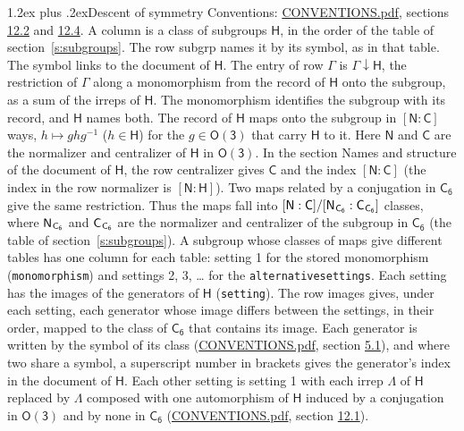 \documentclass[10pt,a4paper]{article}
\makeatletter
\renewcommand\section{\@startsection{section}{1}{\z@}{-3ex plus -1ex minus -.2ex}%
  {1.2ex plus .2ex}{\normalfont\large\sffamily\bfseries\color{parttitle}}}
\numberwithin{equation}{section}
\newcommand{\grp}[1]{\mathsf{#1}}
\newcommand{\grpindex}[2]{[#1 : #2]}
\newcommand{\restr}[2]{#1\!\downarrow#2}
\newcommand{\hairsp}{\mkern1mu}
\makeatother
\begin{document}
\section{Descent of symmetry}\label{s:subduction}
Conventions: \href{../../CONVENTIONS.pdf}{CONVENTIONS.pdf}, sections \href{../../CONVENTIONS.pdf\#conv.12.2}{12.2} and \href{../../CONVENTIONS.pdf\#conv.12.4}{12.4}.
A column is a class of subgroups $\grp{H}$, in the order of the table of section~\ref{s:subgroups}. The row subgrp names it by its symbol, as in that table. The symbol links to the document of $\grp{H}$. The entry of row $\Gamma$ is $\restr{\Gamma}{\grp{H}}$, the restriction of $\Gamma$ along a monomorphism from the record of $\grp{H}$ onto the subgroup, as a sum of the irreps of $\grp{H}$. The monomorphism identifies the subgroup with its record, and $\grp{H}$ names both. \label{n:group.normalizer.o3}\label{n:group.centralizer.o3}The record of $\grp{H}$ maps onto the subgroup in $\grpindex{\grp{N}}{\grp{C}}$ ways, $h \mapsto g h g^{-1}$ ($h \in \grp{H}$) for the $g \in \grp{O(3)}$ that carry $\grp{H}$ to it. Here $\grp{N}$ and $\grp{C}$ are the normalizer and centralizer of $\grp{H}$ in \href{O3.pdf}{$\grp{O(3)}$}. In the section Names and structure of the document of $\grp{H}$, the row centralizer gives $\grp{C}$ and the index $\grpindex{\grp{N}}{\grp{C}}$ (the index in the row normalizer is $\grpindex{\grp{N}}{\grp{H}}$). Two maps related by a conjugation in $\grp{C_{6}}$ give the same restriction. Thus the maps fall into $\grpindex{\grp{N}}{\grp{C}}/\grpindex{\grp{N}_{\hairsp \grp{C_{6}}}}{\grp{C}_{\hairsp \grp{C_{6}}}}$ classes, where $\grp{N}_{\hairsp \grp{C_{6}}}$ and $\grp{C}_{\hairsp \grp{C_{6}}}$ are the normalizer and centralizer of the subgroup in $\grp{C_{6}}$ (the table of section~\ref{s:subgroups}). \label{n:head.setting}A subgroup whose classes of maps give different tables has one column for each table: setting 1 for the stored monomorphism (\texttt{monomorphism}) and settings 2, 3, \dots{} for the \texttt{alternativesettings}. Each setting has the images of the generators of $\grp{H}$ (\texttt{setting}). \label{n:head.images}The row images gives, under each setting, each generator whose image differs between the settings, in their order, mapped to the class of $\grp{C_{6}}$ that contains its image. Each generator is written by the symbol of its class (\href{../../CONVENTIONS.pdf}{CONVENTIONS.pdf}, section \href{../../CONVENTIONS.pdf\#conv.5.1}{5.1}), and where two share a symbol, a superscript number in brackets gives the generator's index in the document of $\grp{H}$. \label{n:irrep.Delta}Each other setting is setting 1 with each irrep $\Lambda$ of $\grp{H}$ replaced by $\Lambda$ composed with one automorphism of $\grp{H}$ induced by a conjugation in \href{O3.pdf}{$\grp{O(3)}$} and by none in $\grp{C_{6}}$ (\href{../../CONVENTIONS.pdf}{CONVENTIONS.pdf}, section \href{../../CONVENTIONS.pdf\#conv.12.1}{12.1}).
\end{document}
